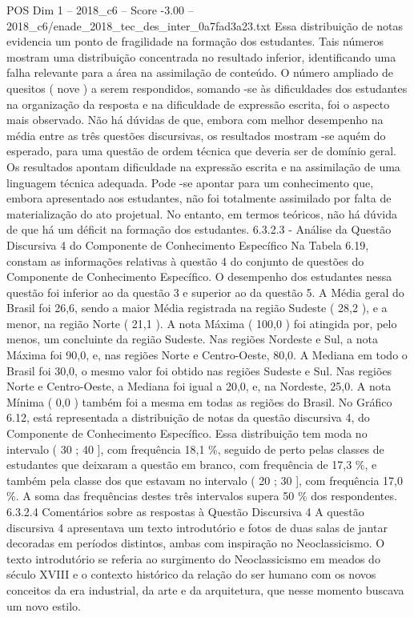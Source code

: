 \begin{textsample}{POS Dim 1 – 2018\_c6 – Score -3.00 – 2018\_c6/enade\_2018\_tec\_des\_inter\_0a7fad3a23.txt}
Essa distribuição de notas evidencia um ponto de fragilidade na formação dos estudantes.
Tais números mostram uma distribuição concentrada no resultado inferior, identificando uma falha relevante para a área na assimilação de conteúdo.
O número ampliado de quesitos ( nove ) a serem respondidos, somando -se às dificuldades dos estudantes na organização da resposta e na dificuldade de expressão escrita, foi o aspecto mais observado.
Não há dúvidas de que, embora com melhor desempenho na média entre as três questões discursivas, os resultados mostram -se aquém do esperado, para uma questão de ordem técnica que deveria ser de domínio geral.
Os resultados apontam dificuldade na expressão escrita e na assimilação de uma linguagem técnica adequada.
Pode -se apontar para um conhecimento que, embora apresentado aos estudantes, não foi totalmente assimilado por falta de materialização do ato projetual.
No entanto, em termos teóricos, não há dúvida de que há um déficit na formação dos estudantes. 6.3.2.3 - Análise da Questão Discursiva 4 do Componente de Conhecimento Específico Na Tabela 6.19, constam as informações relativas à questão 4 do conjunto de questões do Componente de Conhecimento Específico.
O desempenho dos estudantes nessa questão foi inferior ao da questão 3 e superior ao da questão 5.
A Média geral do Brasil foi 26,6, sendo a maior Média registrada na região Sudeste ( 28,2 ), e a menor, na região Norte ( 21,1 ).
A nota Máxima ( 100,0 ) foi atingida por, pelo menos, um concluinte da região Sudeste.
Nas regiões Nordeste e Sul, a nota Máxima foi 90,0, e, nas regiões Norte e Centro-Oeste, 80,0.
A Mediana em todo o Brasil foi 30,0, o mesmo valor foi obtido nas regiões Sudeste e Sul.
Nas regiões Norte e Centro-Oeste, a Mediana foi igual a 20,0, e, na Nordeste, 25,0.
A nota Mínima ( 0,0 ) também foi a mesma em todas as regiões do Brasil.
No Gráfico 6.12, está representada a distribuição de notas da questão discursiva 4, do Componente de Conhecimento Específico.
Essa distribuição tem moda no intervalo ( 30 ; 40 ], com frequência 18,1 \%, seguido de perto pelas classes de estudantes que deixaram a questão em branco, com frequência de 17,3 \%, e também pela classe dos que estavam no intervalo ( 20 ; 30 ], com frequência 17,0 \%.
A soma das frequências destes três intervalos supera 50 \% dos respondentes. 6.3.2.4 Comentários sobre as respostas à Questão Discursiva 4 A questão discursiva 4 apresentava um texto introdutório e fotos de duas salas de jantar decoradas em períodos distintos, ambas com inspiração no Neoclassicismo.
O texto introdutório se referia ao surgimento do Neoclassicismo em meados do século XVIII e o contexto histórico da relação do ser humano com os novos conceitos da era industrial, da arte e da arquitetura, que nesse momento buscava um novo estilo.

\end{textsample}
